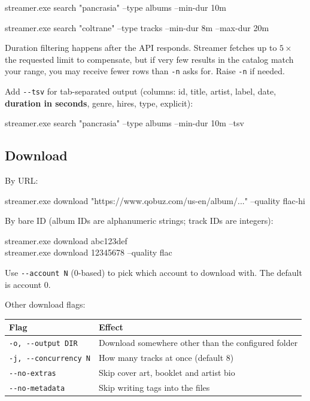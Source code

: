 \documentclass[11pt,a4paper]{article}
\begin{document}
\begin{cmdbox}
streamer.exe search "pancrasia" --type albums --min-dur 10m
\end{cmdbox}

\begin{cmdbox}
streamer.exe search "coltrane" --type tracks --min-dur 8m --max-dur 20m
\end{cmdbox}

\begin{warnbox}
Duration filtering happens after the API responds.  Streamer fetches up to
$5\times$ the requested limit to compensate, but if very few results in the
catalog match your range, you may receive fewer rows than \texttt{-n} asks for.
Raise \texttt{-n} if needed.
\end{warnbox}

Add \texttt{-{}-tsv} for tab-separated output (columns: id, title, artist,
label, date, \textbf{duration in seconds}, genre, hires, type, explicit):

\begin{cmdbox}
streamer.exe search "pancrasia" --type albums --min-dur 10m --tsv
\end{cmdbox}

\subsection{Download}

By URL:

\begin{cmdbox}
streamer.exe download "https://www.qobuz.com/us-en/album/..." --quality flac-hi
\end{cmdbox}

By bare ID (album IDs are alphanumeric strings; track IDs are integers):

\begin{cmdbox}
streamer.exe download abc123def\\
streamer.exe download 12345678 --quality flac
\end{cmdbox}

Use \texttt{-{}-account N} (0-based) to pick which account to download with.
The default is account 0.

Other download flags:

\begin{center}
\begin{tabularx}{\linewidth}{@{}l X@{}}
\toprule
\textbf{Flag} & \textbf{Effect} \\
\midrule
\texttt{-o, -{}-output DIR}   & Download somewhere other than the configured folder \\
\texttt{-j, -{}-concurrency N} & How many tracks at once (default 8) \\
\texttt{-{}-no-extras}        & Skip cover art, booklet and artist bio \\
\texttt{-{}-no-metadata}      & Skip writing tags into the files \\
\bottomrule
\end{tabularx}
\end{center}
\end{document}
